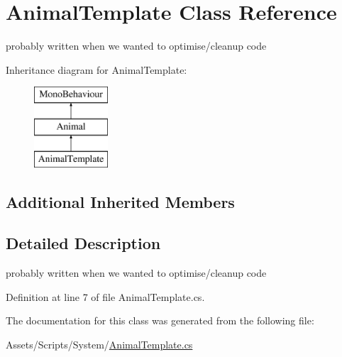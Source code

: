 \hypertarget{class_animal_template}{}\section{Animal\+Template Class Reference}
\label{class_animal_template}


probably written when we wanted to optimise/cleanup code  


Inheritance diagram for Animal\+Template\+:\begin{figure}[H]
\begin{center}
\leavevmode
\includegraphics[height=3.000000cm]{class_animal_template}
\end{center}
\end{figure}
\subsection*{Additional Inherited Members}


\subsection{Detailed Description}
probably written when we wanted to optimise/cleanup code 



Definition at line 7 of file Animal\+Template.\+cs.



The documentation for this class was generated from the following file\+:\begin{DoxyCompactItemize}
\item 
Assets/\+Scripts/\+System/\mbox{\hyperlink{_animal_template_8cs}{Animal\+Template.\+cs}}\end{DoxyCompactItemize}
